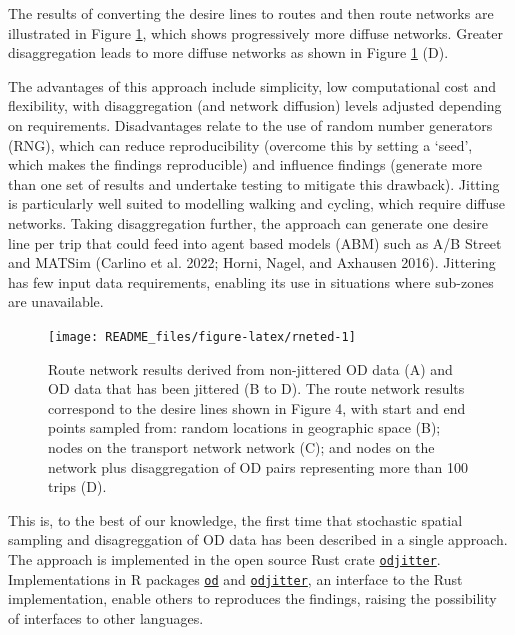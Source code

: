 \documentclass[
]{article}
\begin{document}
The results of converting the desire lines to routes and then route networks are illustrated in Figure \ref{fig:rneted}, which shows progressively more diffuse networks.
Greater disaggregation leads to more diffuse networks as shown in Figure \ref{fig:rneted} (D).

The advantages of this approach include simplicity, low computational cost and flexibility, with disaggregation (and network diffusion) levels adjusted depending on requirements.
Disadvantages relate to the use of random number generators (RNG), which can reduce reproducibility (overcome this by setting a `seed', which makes the findings reproducible) and influence findings (generate more than one set of results and undertake testing to mitigate this drawback).
Jitting is particularly well suited to modelling walking and cycling, which require diffuse networks.
Taking disaggregation further, the approach can generate one desire line per trip that could feed into agent based models (ABM) such as A/B Street and MATSim (Carlino et al. 2022; Horni, Nagel, and Axhausen 2016).
Jittering has few input data requirements, enabling its use in situations where sub-zones are unavailable.

\begin{figure}

{\centering \texttt{[image: README\_files/figure-latex/rneted-1]} 

}

\caption{Route network results derived from non-jittered OD data (A) and OD data that has been jittered (B to D). The route network results correspond to the desire lines shown in Figure 4, with start and end points sampled from: random locations in geographic space (B); nodes on the transport network network (C); and nodes on the network plus disaggregation of OD pairs representing more than 100 trips (D).}\label{fig:rneted}
\end{figure}

This is, to the best of our knowledge, the first time that stochastic spatial sampling and disagreggation of OD data has been described in a single approach.
The approach is implemented in the open source Rust crate \href{https://github.com/dabreegster/odjitter}{\texttt{odjitter}}.
Implementations in R packages \href{https://itsleeds.github.io/od/}{\texttt{od}} and \href{https://github.com/dabreegster/odjitter/tree/main/r}{\texttt{odjitter}}, an interface to the Rust implementation, enable others to reproduces the findings, raising the possibility of interfaces to other languages.
\end{document}
